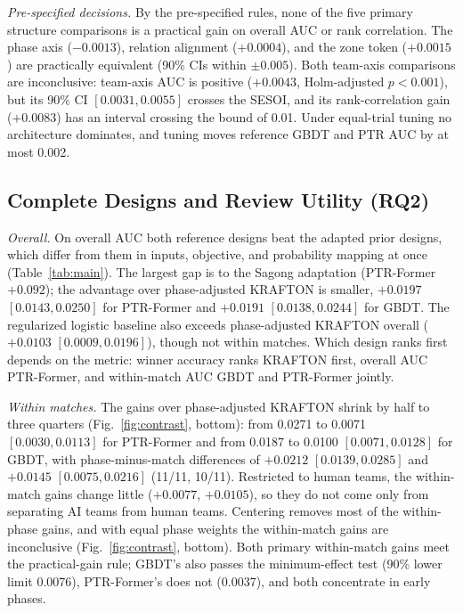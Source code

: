 \documentclass[sigconf,anonymous]{acmart}
\begin{document}
\emph{Pre-specified decisions.} By the pre-specified rules, none of the five primary structure comparisons is a practical gain on overall AUC or rank correlation. The phase axis ($-0.0013$), relation alignment ($+0.0004$), and the zone token ($+0.0015$) are practically equivalent (90\% CIs within $\pm0.005$). Both team-axis comparisons are inconclusive: team-axis AUC is positive ($+0.0043$, Holm-adjusted $p<0.001$), but its 90\% CI $[0.0031,\allowbreak 0.0055]$ crosses the SESOI, and its rank-correlation gain ($+0.0083$) has an interval crossing the bound of 0.01. Under equal-trial tuning no architecture dominates, and tuning moves reference GBDT and PTR AUC by at most 0.002.

\subsection{Complete Designs and Review Utility (RQ2)}
\label{sec:results:designs}

\emph{Overall.} On overall AUC both reference designs beat the adapted prior designs, which differ from them in inputs, objective, and probability mapping at once (Table~\ref{tab:main}). The largest gap is to the Sagong adaptation (PTR-Former $+0.092$); the advantage over phase-adjusted KRAFTON is smaller, $+0.0197$ $[0.0143,\allowbreak 0.0250]$ for PTR-Former and $+0.0191$ $[0.0138,\allowbreak 0.0244]$ for GBDT. The regularized logistic baseline also exceeds phase-adjusted KRAFTON overall ($+0.0103$ $[0.0009,\allowbreak 0.0196]$), though not within matches. Which design ranks first depends on the metric: winner accuracy ranks KRAFTON first, overall AUC PTR-Former, and within-match AUC GBDT and PTR-Former jointly.

\emph{Within matches.} The gains over phase-adjusted KRAFTON shrink by half to three quarters (Fig.~\ref{fig:contrast}, bottom): from 0.0271 to 0.0071 $[0.0030,\allowbreak 0.0113]$ for PTR-Former and from 0.0187 to 0.0100 $[0.0071,\allowbreak 0.0128]$ for GBDT, with phase-minus-match differences of $+0.0212$ $[0.0139,\allowbreak 0.0285]$ and $+0.0145$ $[0.0075,\allowbreak 0.0216]$ (11/11, 10/11). Restricted to human teams, the within-match gains change little ($+0.0077$, $+0.0105$), so they do not come only from separating AI teams from human teams. Centering removes most of the within-phase gains, and with equal phase weights the within-match gains are inconclusive (Fig.~\ref{fig:contrast}, bottom). Both primary within-match gains meet the practical-gain rule; GBDT's also passes the minimum-effect test (90\% lower limit 0.0076), PTR-Former's does not (0.0037), and both concentrate in early phases.
\end{document}
